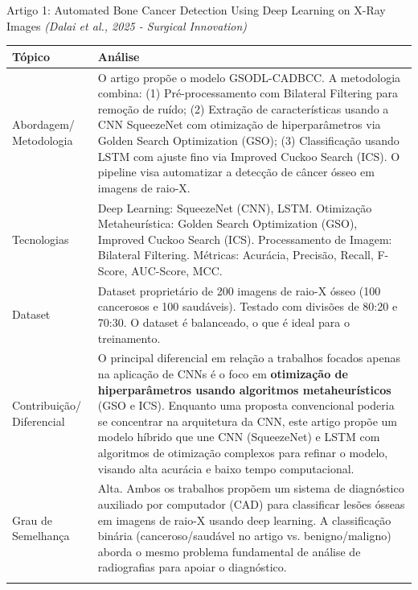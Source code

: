 \documentclass[12pt, a4paper]{article}
\begin{document}
\begin{fichabox}{Artigo 1: Automated Bone Cancer Detection Using Deep Learning on X-Ray Images}
\textit{(Dalai et al., 2025 - Surgical Innovation)}

\begin{longtable}{@{} B L{10.5cm} @{}}
    \toprule
    \textbf{Tópico} & \textbf{Análise} \\
    \midrule
    \endhead %
    
    Abordagem/ Metodologia & O artigo propõe o modelo GSODL-CADBCC. A metodologia combina: (1) Pré-processamento com Bilateral Filtering para remoção de ruído; (2) Extração de características usando a CNN SqueezeNet com otimização de hiperparâmetros via Golden Search Optimization (GSO); (3) Classificação usando LSTM com ajuste fino via Improved Cuckoo Search (ICS). O pipeline visa automatizar a detecção de câncer ósseo em imagens de raio-X. \\
    \addlinespace
    
    Tecnologias & Deep Learning: SqueezeNet (CNN), LSTM. Otimização Metaheurística: Golden Search Optimization (GSO), Improved Cuckoo Search (ICS). Processamento de Imagem: Bilateral Filtering. Métricas: Acurácia, Precisão, Recall, F-Score, AUC-Score, MCC. \\
    \addlinespace
    
    Dataset & Dataset proprietário de 200 imagens de raio-X ósseo (100 cancerosos e 100 saudáveis). Testado com divisões de 80:20 e 70:30. O dataset é balanceado, o que é ideal para o treinamento. \\
    \addlinespace
    
    Contribuição/ Diferencial & O principal diferencial em relação a trabalhos focados apenas na aplicação de CNNs é o foco em \textbf{otimização de hiperparâmetros usando algoritmos metaheurísticos} (GSO e ICS). Enquanto uma proposta convencional poderia se concentrar na arquitetura da CNN, este artigo propõe um modelo híbrido que une CNN (SqueezeNet) e LSTM com algoritmos de otimização complexos para refinar o modelo, visando alta acurácia e baixo tempo computacional. \\
    \addlinespace
    
    Grau de Semelhança & Alta. Ambos os trabalhos propõem um sistema de diagnóstico auxiliado por computador (CAD) para classificar lesões ósseas em imagens de raio-X usando deep learning. A classificação binária (canceroso/saudável no artigo vs. benigno/maligno) aborda o mesmo problema fundamental de análise de radiografias para apoiar o diagnóstico. \\
    \addlinespace
    

\end{longtable}
\end{fichabox}
\end{document}
